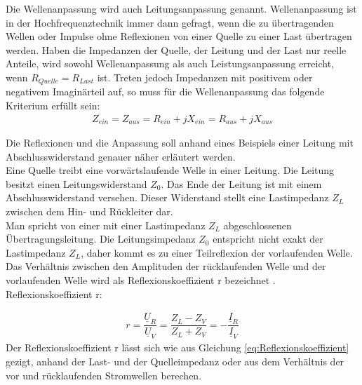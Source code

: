 Die Wellenanpassung wird auch Leitungsanpassung  genannt. Wellenanpassung ist in der Hochfrequenztechnik immer dann gefragt, wenn die zu übertragenden Wellen oder Impulse ohne Reflexionen von einer Quelle zu einer Last übertragen werden. Haben die Impedanzen der Quelle, der Leitung und der Last nur reelle Anteile, wird sowohl Wellenanpassung als auch Leistungsanpassung erreicht, wenn $R_{Quelle} = R_{Last}$ ist. Treten jedoch Impedanzen mit positivem oder negativem Imaginärteil auf, so muss für die Wellenanpassung das folgende Kriterium erfüllt sein: \\
\begin{eqnarray}\label{eq:ZeinZaus}
Z_{ein} = Z_{aus} = R_{ein} +jX_{ein} = R_{aus} + jX_{aus}
\end{eqnarray}



Die Reflexionen und die Anpassung soll anhand eines Beispiels einer Leitung mit Abschlusswiderstand genauer näher erläutert werden. \\

Eine Quelle treibt eine vorwärtslaufende Welle in einer Leitung. Die Leitung besitzt einen Leitungswiderstand $Z_0$.  Das Ende der Leitung ist mit einem Abschlusswiderstand versehen. Dieser Widerstand stellt eine Lastimpedanz $Z_L$ zwischen dem Hin- und Rückleiter dar. \\
Man spricht von einer mit einer Lastimpedanz $Z_L$ abgeschlossenen Übertragungsleitung.  Die Leitungsimpedanz $Z_0$ entspricht nicht exakt der Lastimpedanz $Z_L$, daher kommt es zu einer   Teilreflexion der vorlaufenden Welle. Das Verhältnis zwischen den Amplituden der rücklaufenden Welle und der vorlaufenden Welle wird als Reflexionskoeffizient r bezeichnet \cite{Tekom}. \\

Reflexionskoeffizient r:

\begin{eqnarray}\label{eq:Reflexionskoeffizient}
r=\dfrac{\underline{U}_{R}}{\underline{U}_{V}}=\dfrac{Z_{L}-Z_{V}}{Z_{L} + Z_{V}}=-\dfrac{\underline{I}_{R}}{\underline{I}_{V}}
\end{eqnarray}
Der Reflexionskoeffizient r lässt sich wie aus Gleichung \ref{eq:Reflexionskoeffizient} gezigt, anhand der Last- und der Quelleimpedanz oder aus dem Verhältnis der vor und rücklaufenden Stromwellen berechen.

